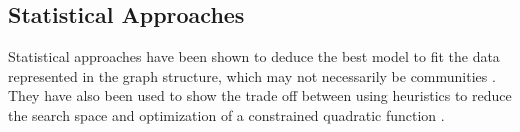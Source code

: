 \documentclass{article}
\begin{document}


\subsection{Statistical Approaches}
Statistical approaches have been shown to deduce the best model to fit the data represented in the graph structure, which may not necessarily be communities \cite{newman2004finding}.
They have also been used to show the trade off between using heuristics to reduce the search space and optimization of a constrained quadratic function \cite{yang2013hierarchical}.
\end{document}
